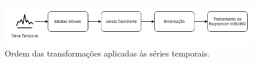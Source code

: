 \begin{figure}[!ht]
    \centering
    \includegraphics[width=5.0in]{img/transforms_order.png}
    \caption{Ordem das transformações aplicadas às séries temporais.}
    \label{fig:transforms_order}
\end{figure}

